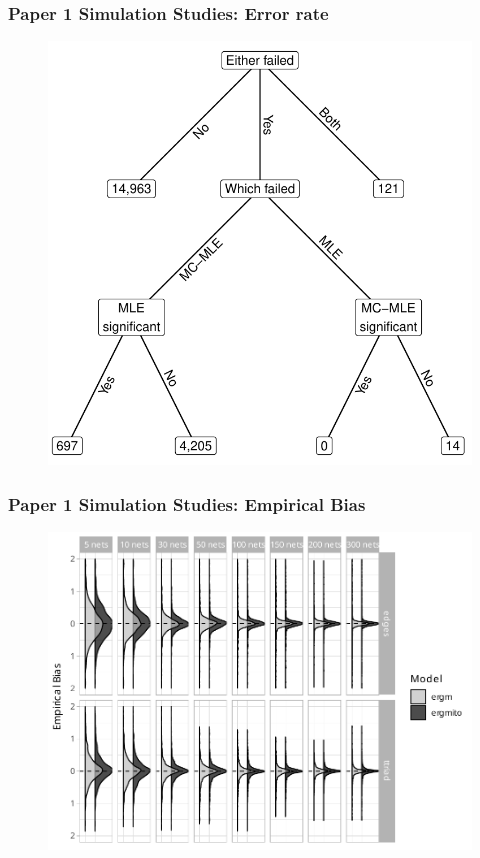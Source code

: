 \documentclass[aspectratio=169, 10pt]{beamer}\usepackage[]{graphicx}\usepackage[]{color}
\begin{document}
\begin{frame}[label=ergmsims,allowframebreaks]
\frametitle{Paper 1 Simulation Studies: Error rate}

\begin{figure}
\centering
\includegraphics[width=.4\linewidth]{failed-tree.pdf}
\end{figure}

\hyperlink{ergmitoexperiment}{}

\end{frame}

\begin{frame}
\frametitle{Paper 1 Simulation Studies: Empirical Bias}

\begin{figure}
\centering
\includegraphics[width=.6\linewidth]{bias-02-various-sizes-4-5-ttriad.pdf}
\end{figure}

\hyperlink{ergmitoexperiment}{}

\end{frame}
\end{document}
